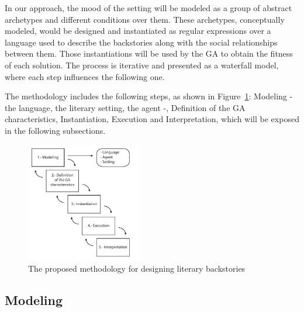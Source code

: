 \documentclass[letterpaper]{article}
\begin{document}
In our approach, the mood of the setting will be modeled as a group of abstract archetypes and different conditions over them. These archetypes, conceptually modeled, would be designed and instantiated as regular expressions over a language used to describe the backstories along with the social relationships between them. Those instantiations will be used by the GA to obtain the fitness of each solution. The process is iterative and presented as a waterfall model, where each step influences the following one.

The methodology includes the following steps, as shown in Figure~\ref{fig:methodology}: Modeling - the language, the literary setting, the agent -, Definition of the GA characteristics, Instantiation, Execution and Interpretation, which will be exposed in the following subsections.


\begin{figure}[htb]
\centering
   \includegraphics[width=12pc] {img/methodology.pdf}
\caption{The proposed methodology for designing literary backstories}
\label{fig:methodology}
\end{figure}


\subsection{Modeling}
\end{document}

